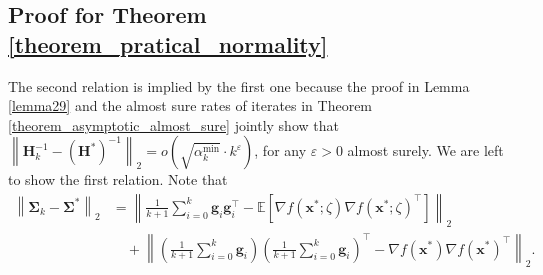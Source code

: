\documentclass[aos]{imsart}
\numberwithin{equation}{section}
\theoremstyle{plain}
\begin{document}
\begin{appendix}
\subsection{Proof for Theorem \ref{theorem_pratical_normality}}
\label{sec:appendix3.4}
The second relation is implied by the first one because the proof in Lemma \ref{lemma29} and the almost sure rates of iterates in Theorem \ref{theorem_asymptotic_almost_sure} jointly show that $\left\|\bm{H}_k^{-1} - \left(\bm{H}^{*}\right)^{-1} \right\|_2 = o\left(\sqrt{\alpha^{\min}_k} \cdot k^{\varepsilon} \right)$,
    for any $\varepsilon > 0$ almost surely. We are left to show the first relation. Note that
    \begin{equation*}
        \begin{split}
             \left\| \bm{\Sigma}_{k} - \bm{\Sigma}^{*} \right\|_2 & = \left\|  \frac{1}{k+1}\sum_{i=0}^{k} \bm{g}_i  \bm{g}_i^{\top} - \mathbb{E} \left[ \nabla f(\bm{x}^{*};\zeta)   \nabla f(\bm{x}^{*};\zeta)^{\top} \right]\right\|_2 \\
             & \hspace{1em} + \left\| \left( \frac{1}{k+1}\sum_{i=0}^{k} \bm{g}_i\right)\left( \frac{1}{k+1}\sum_{i=0}^{k} \bm{g}_i\right)^{\top} - \nabla f(\bm{x}^{*})\nabla f(\bm{x}^{*})^{\top}\right\|_2.
        \end{split}
    \end{equation*}


\end{appendix}
\end{document}
